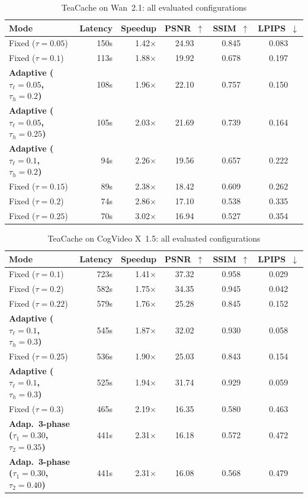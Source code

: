 \begin{table}[htbp]
\centering
\small
\setlength{\tabcolsep}{5pt}
\caption{TeaCache on Wan~2.1: all evaluated configurations}
\label{tab:app-tc-wan}
\begin{tabular}{lrrccc}
\toprule
\textbf{Mode} & \textbf{Latency} & \textbf{Speedup} & \textbf{PSNR~$\uparrow$} & \textbf{SSIM~$\uparrow$} & \textbf{LPIPS~$\downarrow$} \\
\midrule
  Fixed ($\tau=0.05$) & 150s & 1.42$\times$ & 24.93 & 0.845 & 0.083 \\
  Fixed ($\tau=0.1$) & 113s & 1.88$\times$ & 19.92 & 0.678 & 0.197 \\
  \textbf{Adaptive ($\tau_\ell=0.05$, $\tau_h=0.2$)} & 108s & 1.96$\times$ & 22.10 & 0.757 & 0.150 \\
  \textbf{Adaptive ($\tau_\ell=0.05$, $\tau_h=0.25$)} & 105s & 2.03$\times$ & 21.69 & 0.739 & 0.164 \\
  \textbf{Adaptive ($\tau_\ell=0.1$, $\tau_h=0.2$)} & 94s & 2.26$\times$ & 19.56 & 0.657 & 0.222 \\
  Fixed ($\tau=0.15$) & 89s & 2.38$\times$ & 18.42 & 0.609 & 0.262 \\
  Fixed ($\tau=0.2$) & 74s & 2.86$\times$ & 17.10 & 0.538 & 0.335 \\
  Fixed ($\tau=0.25$) & 70s & 3.02$\times$ & 16.94 & 0.527 & 0.354 \\
\bottomrule
\end{tabular}
\end{table}

\begin{table}[htbp]
\centering
\small
\setlength{\tabcolsep}{5pt}
\caption{TeaCache on CogVideo X~1.5: all evaluated configurations}
\label{tab:app-tc-cog}
\begin{tabular}{lrrccc}
\toprule
\textbf{Mode} & \textbf{Latency} & \textbf{Speedup} & \textbf{PSNR~$\uparrow$} & \textbf{SSIM~$\uparrow$} & \textbf{LPIPS~$\downarrow$} \\
\midrule
  Fixed ($\tau=0.1$) & 723s & 1.41$\times$ & 37.32 & 0.958 & 0.029 \\
  Fixed ($\tau=0.2$) & 582s & 1.75$\times$ & 34.35 & 0.945 & 0.042 \\
  Fixed ($\tau=0.22$) & 579s & 1.76$\times$ & 25.28 & 0.845 & 0.152 \\
  \textbf{Adaptive ($\tau_\ell=0.1$, $\tau_h=0.3$)} & 545s & 1.87$\times$ & 32.02 & 0.930 & 0.058 \\
  Fixed ($\tau=0.25$) & 536s & 1.90$\times$ & 25.03 & 0.843 & 0.154 \\
  \textbf{Adaptive ($\tau_\ell=0.1$, $\tau_h=0.3$)} & 525s & 1.94$\times$ & 31.74 & 0.929 & 0.059 \\
  Fixed ($\tau=0.3$) & 465s & 2.19$\times$ & 16.35 & 0.580 & 0.463 \\
  \textbf{Adap.\ 3-phase ($\tau_1=0.30$, $\tau_2=0.35$)} & 441s & 2.31$\times$ & 16.18 & 0.572 & 0.472 \\
  \textbf{Adap.\ 3-phase ($\tau_1=0.30$, $\tau_2=0.40$)} & 441s & 2.31$\times$ & 16.08 & 0.568 & 0.479 \\
\bottomrule
\end{tabular}
\end{table}

